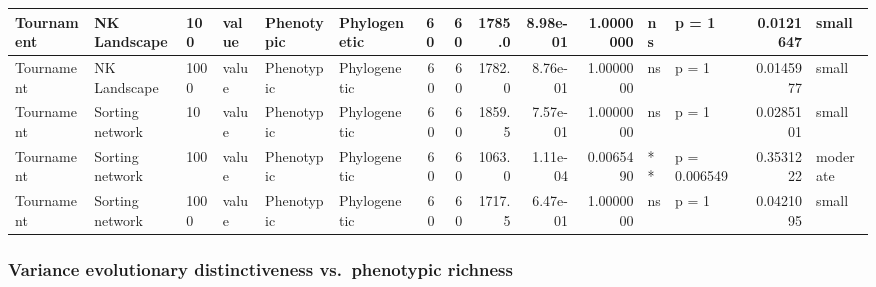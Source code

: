 \documentclass[]{book}
\begin{document}
\begin{table}
\begin{tabular}[t]{l|l|l|l|l|l|r|r|r|r|r|l|l|r|l}
\hline
Tournament & NK Landscape & 100 & value & Phenotypic & Phylogenetic & 60 & 60 & 1785.0 & 8.98e-01 & 1.0000000 & ns & p = 1 & 0.0121647 & small\\
\hline
Tournament & NK Landscape & 1000 & value & Phenotypic & Phylogenetic & 60 & 60 & 1782.0 & 8.76e-01 & 1.0000000 & ns & p = 1 & 0.0145977 & small\\
\hline
Tournament & Sorting network & 10 & value & Phenotypic & Phylogenetic & 60 & 60 & 1859.5 & 7.57e-01 & 1.0000000 & ns & p = 1 & 0.0285101 & small\\
\hline
Tournament & Sorting network & 100 & value & Phenotypic & Phylogenetic & 60 & 60 & 1063.0 & 1.11e-04 & 0.0065490 & ** & p = 0.006549 & 0.3531222 & moderate\\
\hline
Tournament & Sorting network & 1000 & value & Phenotypic & Phylogenetic & 60 & 60 & 1717.5 & 6.47e-01 & 1.0000000 & ns & p = 1 & 0.0421095 & small\\
\hline
\end{tabular}
\end{table}

\hypertarget{variance-evolutionary-distinctiveness-vs.phenotypic-richness}{%
\subsubsection{Variance evolutionary distinctiveness vs.~phenotypic richness}\label{variance-evolutionary-distinctiveness-vs.phenotypic-richness}}
\end{document}
